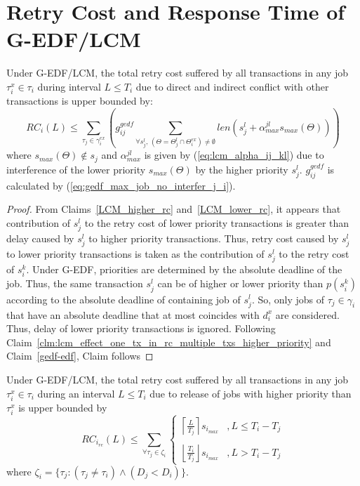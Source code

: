 \section{Retry Cost and Response Time of G-EDF/LCM}\label{response g-edf/lcm}
%
\begin{clm}\label{GEDF/LCM response time}
%
Under G-EDF/LCM, the total retry cost suffered by all transactions in any job $\tau_i^x \in \tau_i$ during interval $L \le T_{i}$ due to direct and indirect conflict with other transactions is upper bounded by:
%
\begin{equation}
RC_i\left(L\right) \le \sum_{\tau_{j}\in\gamma_i^{ex}}\left(g_{ij}^{gedf} \sum_{\forall s_j^l,\,\left(\Theta=\Theta_j^l \cap \Theta_i^{ex}\right) \neq \emptyset} len\left(s_{j}^{l} +
\alpha_{max}^{jl}s_{max}(\Theta)\right)\right)
\label{eq78}
\end{equation}
%
where $s_{max}\left(\Theta\right) \not\in s_j$ and $\alpha_{max}^{jl}$ is given by (\ref{eq:lcm_alpha_ij_kl}) due to interference of the lower priority $s_{max}\left(\Theta\right)$ by the higher priority $s_j^l$. $g_{ij}^{gedf}$ is calculated by (\ref{eq:gedf_max_job_no_interfer_j_i}).
%
\end{clm}
%
\begin{proof}\normalfont
%
From Claims~\ref{LCM_higher_rc} and~\ref{LCM_lower_rc}, it appears that contribution of $s_j^l$ to the retry cost of lower priority transactions is greater than delay caused by $s_j^l$ to higher priority transactions. Thus, retry cost caused by $s_j^l$ to lower priority transactions is taken as the contribution of $s_j^l$ to the retry cost of $s_i^k$. Under G-EDF, priorities are determined by the absolute deadline of the job. Thus, the same transaction $s_j^l$ can be of higher or lower priority than $p\left(s_i^k\right)$ according to the absolute deadline of containing job of $s_j^l$. So, only jobs of $\tau_j \in \gamma_i$ that have an absolute deadline that at most coincides with $d_i^x$ are considered. Thus, delay of lower priority transactions is ignored. Following Claim~\ref{clm:lcm_effect_one_tx_in_rc_multiple_txs_higher_priority} and Claim~\ref{gedf-edf}, Claim follows
%
\end{proof}
%
\begin{clm}\label{clm:gedf_lcm_release_conflict}
%
Under G-EDF/LCM, the total retry cost suffered by all transactions in any job $\tau_i^x \in \tau_i$ during an interval $L \le T_i$ due to release of jobs with higher priority than $\tau_i^x$ is upper bounded by 
\begin{equation}
RC_{i_{re}}(L) \le \sum_{\forall \tau_{j}\in\zeta_{i}}\begin{cases}
\left\lceil \frac{L}{T_{j}}\right\rceil s_{i_{max}} & ,L\le T_{i}-T_{j}\\\\
\left\lfloor \frac{T_{i}}{T_{j}}\right\rfloor s_{i_{max}} & ,L>T_{i}-T_{j}
\end{cases}\label{eq:gedf_lcm_release_conflict}
\end{equation}
%
where $\zeta_i=\{\tau_j:\left(\tau_j \ne \tau_i\right)\wedge \left(D_j < D_i \right)\}$.
\end{clm}
